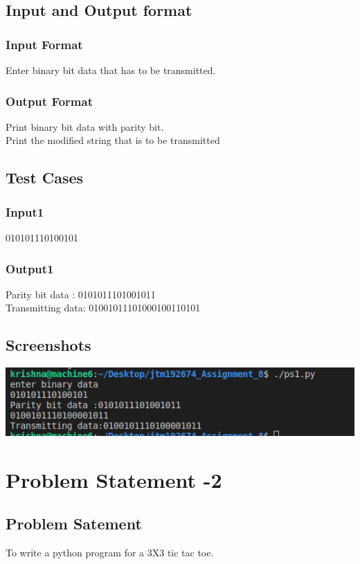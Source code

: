 \documentclass[12pt]{article}
\begin{document}
  \subsection{Input and Output format}
  \subsubsection{Input Format} 
Enter binary bit data that has to be transmitted.\\


\subsubsection{Output Format}
Print binary bit data with parity bit.\\
Print the modified string that is to be transmitted\\

  \subsection{Test Cases}
  \subsubsection{Input1}
  010101110100101\\

    
  \subsubsection{Output1}
  Parity bit data : 0101011101001011\\
Transmitting data: 01001011101000100110101\\

\subsection{Screenshots}
\includegraphics[width=\linewidth]{lab8_1.png}
  \section{Problem Statement -2}
  \subsection{Problem Satement}
   To write a python program for a 3X3 tic tac toe.
\end{document}
